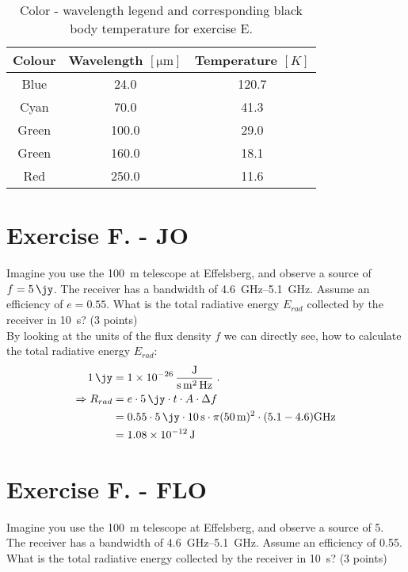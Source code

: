 \documentclass[11pt,a4paper,twoside]{article}
\begin{document}
\begin{table}[h!]
\centering
\begin{tabular}{ccc}\toprule
Colour  & Wavelength $[\si{\micro\meter}]$  & Temperature $[K]$  \\ \midrule
Blue    & 24.0  & 120.7                \\
Cyan    & 70.0  & 41.3                \\
Green   & 100.0 & 29.0                \\
Green   & 160.0 & 18.1                \\
Red     & 250.0 & 11.6               \\
\bottomrule
\end{tabular}
\caption{Color - wavelength legend and corresponding black body temperature for
         exercise E.}
\label{tab:col}
\end{table}


\section*{Exercise F. - JO}

Imagine you use the \SI{100}{\meter} telescope at Effelsberg, and observe a
source of $f = \SI{5}{\jy}$. The receiver has a bandwidth of
\SIrange{4.6}{5.1}{\giga\hertz}. Assume an efficiency of $e=0.55$.  What is the
total radiative energy $E_{rad}$ collected by the receiver in \SI{10}{\second}? (3
points) \\

By looking at the units of the flux density $f$ we can directly see, how to 
calculate the total radiative energy $E_{rad}$:
\begin{align}
\SI{1}{\jy} &= \SI[per-mode=fraction]{1e-26}{\joule\per\second\per\meter\squared\per\hertz}\;. \\
\Rightarrow
R_{rad} &= e \cdot \SI{5}{\jy} \cdot t \cdot A \cdot \Delta f \\
&= 0.55 \cdot \SI{5}{\jy} \cdot \SI{10}{\second} \cdot \pi(\SI{50}{\meter})^2 \cdot (5.1-4.6)\si{\giga\hertz} \\
&= \SI{1.08e-12}{\joule}
\end{align}


\section*{Exercise F. - FLO} 

Imagine you use the \SI{100}{\metre} telescope at Effelsberg, and observe a
source of \SI{5}{\jansky}. The receiver has a bandwidth of
\SIrange{4.6}{5.1}{\GHz}. Assume an efficiency of \num{0.55}. What is the total
radiative energy collected by the receiver in \SI{10}{\second}? (3 points) \\
\end{document}
